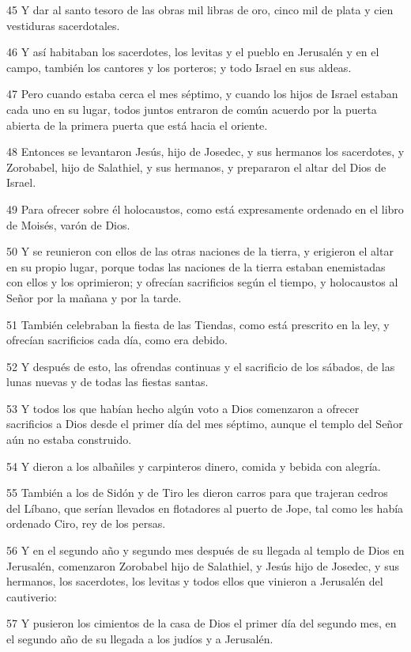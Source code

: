 \par 45 Y dar al santo tesoro de las obras mil libras de oro, cinco mil de plata y cien vestiduras sacerdotales.
\par 46 Y así habitaban los sacerdotes, los levitas y el pueblo en Jerusalén y en el campo, también los cantores y los porteros; y todo Israel en sus aldeas.
\par 47 Pero cuando estaba cerca el mes séptimo, y cuando los hijos de Israel estaban cada uno en su lugar, todos juntos entraron de común acuerdo por la puerta abierta de la primera puerta que está hacia el oriente.
\par 48 Entonces se levantaron Jesús, hijo de Josedec, y sus hermanos los sacerdotes, y Zorobabel, hijo de Salathiel, y sus hermanos, y prepararon el altar del Dios de Israel.
\par 49 Para ofrecer sobre él holocaustos, como está expresamente ordenado en el libro de Moisés, varón de Dios.
\par 50 Y se reunieron con ellos de las otras naciones de la tierra, y erigieron el altar en su propio lugar, porque todas las naciones de la tierra estaban enemistadas con ellos y los oprimieron; y ofrecían sacrificios según el tiempo, y holocaustos al Señor por la mañana y por la tarde.
\par 51 También celebraban la fiesta de las Tiendas, como está prescrito en la ley, y ofrecían sacrificios cada día, como era debido.
\par 52 Y después de esto, las ofrendas continuas y el sacrificio de los sábados, de las lunas nuevas y de todas las fiestas santas.
\par 53 Y todos los que habían hecho algún voto a Dios comenzaron a ofrecer sacrificios a Dios desde el primer día del mes séptimo, aunque el templo del Señor aún no estaba construido.
\par 54 Y dieron a los albañiles y carpinteros dinero, comida y bebida con alegría.
\par 55 También a los de Sidón y de Tiro les dieron carros para que trajeran cedros del Líbano, que serían llevados en flotadores al puerto de Jope, tal como les había ordenado Ciro, rey de los persas.
\par 56 Y en el segundo año y segundo mes después de su llegada al templo de Dios en Jerusalén, comenzaron Zorobabel hijo de Salathiel, y Jesús hijo de Josedec, y sus hermanos, los sacerdotes, los levitas y todos ellos que vinieron a Jerusalén del cautiverio:
\par 57 Y pusieron los cimientos de la casa de Dios el primer día del segundo mes, en el segundo año de su llegada a los judíos y a Jerusalén.
